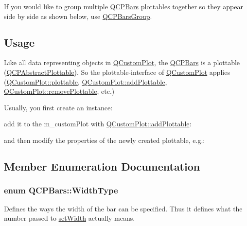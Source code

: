 \-If you would like to group multiple \hyperlink{classQCPBars}{\-Q\-C\-P\-Bars} plottables together so they appear side by side as shown below, use \hyperlink{classQCPBarsGroup}{\-Q\-C\-P\-Bars\-Group}.

\hypertarget{classQCPStatisticalBox_usage}{}\subsection{\-Usage}\label{classQCPStatisticalBox_usage}
\-Like all data representing objects in \hyperlink{classQCustomPlot}{\-Q\-Custom\-Plot}, the \hyperlink{classQCPBars}{\-Q\-C\-P\-Bars} is a plottable (\hyperlink{classQCPAbstractPlottable}{\-Q\-C\-P\-Abstract\-Plottable}). \-So the plottable-\/interface of \hyperlink{classQCustomPlot}{\-Q\-Custom\-Plot} applies (\hyperlink{classQCustomPlot_a32de81ff53e263e785b83b52ecd99d6f}{\-Q\-Custom\-Plot\-::plottable}, \hyperlink{classQCustomPlot_ab7ad9174f701f9c6f64e378df77927a6}{\-Q\-Custom\-Plot\-::add\-Plottable}, \hyperlink{classQCustomPlot_af3dafd56884208474f311d6226513ab2}{\-Q\-Custom\-Plot\-::remove\-Plottable}, etc.)

\-Usually, you first create an instance\-: 
\begin{DoxyCodeInclude}
\end{DoxyCodeInclude}
 add it to the m\-\_\-custom\-Plot with \hyperlink{classQCustomPlot_ab7ad9174f701f9c6f64e378df77927a6}{\-Q\-Custom\-Plot\-::add\-Plottable}\-: 
\begin{DoxyCodeInclude}
\end{DoxyCodeInclude}
 and then modify the properties of the newly created plottable, e.\-g.\-: 
\begin{DoxyCodeInclude}
\end{DoxyCodeInclude}


\subsection{\-Member \-Enumeration \-Documentation}
\hypertarget{classQCPBars_a65dbbf1ab41cbe993d71521096ed4649}{
\subsubsection[{\-Width\-Type}]{\setlength{\rightskip}{0pt plus 5cm}enum {\bf \-Q\-C\-P\-Bars\-::\-Width\-Type}}}\label{classQCPBars_a65dbbf1ab41cbe993d71521096ed4649}
\-Defines the ways the width of the bar can be specified. \-Thus it defines what the number passed to \hyperlink{classQCPBars_afec6116579d44d5b706e0fa5e5332507}{set\-Width} actually means.

